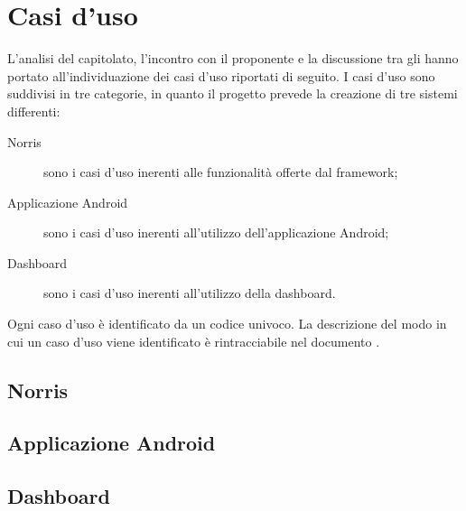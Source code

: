 \section{Casi d'uso}
L’analisi del capitolato, l’incontro con il proponente e la discussione tra gli  hanno portato all'individuazione dei casi d'uso riportati di seguito. 
I casi d'uso sono suddivisi in tre categorie, in quanto il progetto prevede la creazione di tre sistemi differenti:
\begin{description}
	\item[Norris] sono i casi d'uso inerenti alle funzionalità offerte dal framework;
	\item[Applicazione Android] sono i casi d'uso inerenti all'utilizzo dell'applicazione Android;
	\item[Dashboard] sono i casi d'uso inerenti all'utilizzo della dashboard.
\end{description}
Ogni caso d'uso è identificato da un codice univoco. La descrizione del modo in cui un caso d'uso viene identificato  è rintracciabile nel documento .
\subsection{Norris}


\subsection{Applicazione Android}


\subsection{Dashboard}


